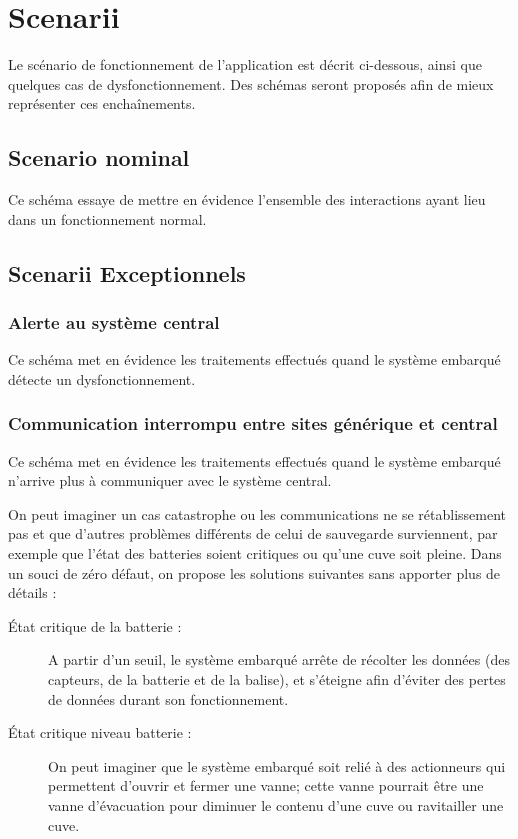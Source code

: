 \section{Scenarii}

Le scénario de fonctionnement de l'application est décrit ci-dessous, ainsi que quelques
cas de dysfonctionnement. Des schémas seront proposés afin de mieux représenter ces enchaînements.

    \subsection{Scenario nominal}
Ce schéma essaye de mettre en évidence l'ensemble des interactions ayant lieu dans un fonctionnement normal.

    \subsection{Scenarii Exceptionnels}

            \subsubsection{Alerte au système central}
Ce schéma met en évidence les traitements effectués quand le système embarqué détecte un dysfonctionnement.

            \subsubsection{Communication interrompu entre sites générique et central}
Ce schéma met en évidence les traitements effectués quand le système embarqué n'arrive plus à communiquer 
avec le système central.

On peut imaginer un cas catastrophe ou les communications ne se rétablissement pas et que d'autres problèmes différents de celui de sauvegarde surviennent, par exemple que l'état des batteries soient critiques ou qu'une cuve soit pleine. Dans un souci de zéro défaut, on propose les solutions suivantes sans apporter plus de détails :
 \begin{description}
        \item[État critique de la batterie :] A partir d'un seuil, le système embarqué arrête de récolter les données (des capteurs, de la batterie et de la balise), et s'éteigne afin d'éviter des pertes de données durant son fonctionnement.
        \item[État critique niveau batterie :] On peut imaginer que le système embarqué soit relié à des actionneurs qui permettent d'ouvrir et fermer une vanne; cette vanne pourrait être une vanne d'évacuation pour diminuer le contenu d'une cuve ou ravitailler une cuve.
\end{description}
